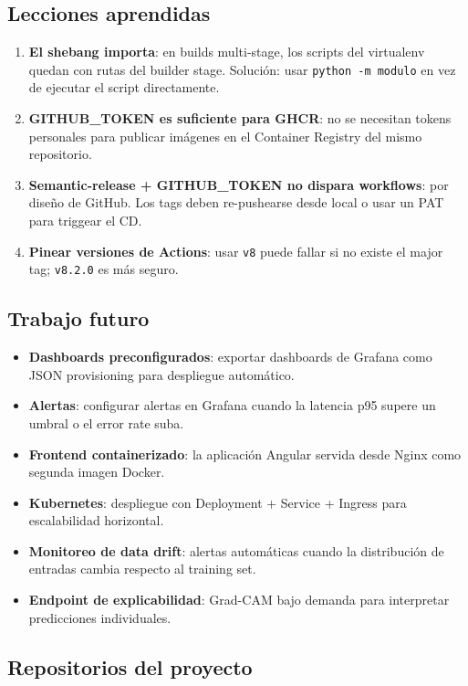 \subsection{Lecciones aprendidas}

\begin{enumerate}
    \item \textbf{El shebang importa}: en builds multi-stage, los scripts del virtualenv quedan con rutas del builder stage. Soluci\'on: usar \texttt{python -m modulo} en vez de ejecutar el script directamente.
    \item \textbf{GITHUB\_TOKEN es suficiente para GHCR}: no se necesitan tokens personales para publicar im\'agenes en el Container Registry del mismo repositorio.
    \item \textbf{Semantic-release + GITHUB\_TOKEN no dispara workflows}: por dise\~no de GitHub. Los tags deben re-pushearse desde local o usar un PAT para triggear el CD.
    \item \textbf{Pinear versiones de Actions}: usar \texttt{v8} puede fallar si no existe el major tag; \texttt{v8.2.0} es m\'as seguro.
\end{enumerate}

\subsection{Trabajo futuro}

\begin{itemize}
    \item \textbf{Dashboards preconfigurados}: exportar dashboards de Grafana como JSON provisioning para despliegue autom\'atico.
    \item \textbf{Alertas}: configurar alertas en Grafana cuando la latencia p95 supere un umbral o el error rate suba.
    \item \textbf{Frontend containerizado}: la aplicaci\'on Angular servida desde Nginx como segunda imagen Docker.
    \item \textbf{Kubernetes}: despliegue con Deployment + Service + Ingress para escalabilidad horizontal.
    \item \textbf{Monitoreo de data drift}: alertas autom\'aticas cuando la distribuci\'on de entradas cambia respecto al training set.
    \item \textbf{Endpoint de explicabilidad}: Grad-CAM bajo demanda para interpretar predicciones individuales.
\end{itemize}

\subsection{Repositorios del proyecto}

